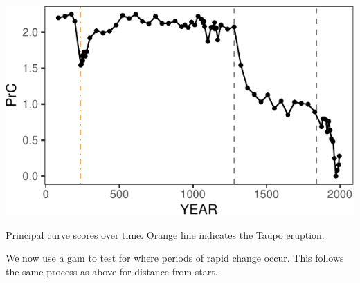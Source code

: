 \documentclass[nofonts,]{tufte-handout}
\newenvironment{Shaded}{\begin{snugshade}}{\end{snugshade}}
\newcommand{\AttributeTok}[1]{\textcolor[rgb]{0.13,0.29,0.53}{#1}}
\newcommand{\CommentTok}[1]{\textcolor[rgb]{0.56,0.35,0.01}{\textit{#1}}}
\newcommand{\DecValTok}[1]{\textcolor[rgb]{0.00,0.00,0.81}{#1}}
\newcommand{\FunctionTok}[1]{\textcolor[rgb]{0.13,0.29,0.53}{\textbf{#1}}}
\newcommand{\NormalTok}[1]{#1}
\newcommand{\OtherTok}[1]{\textcolor[rgb]{0.56,0.35,0.01}{#1}}
\newcommand{\SpecialCharTok}[1]{\textcolor[rgb]{0.81,0.36,0.00}{\textbf{#1}}}
\newcommand{\StringTok}[1]{\textcolor[rgb]{0.31,0.60,0.02}{#1}}
\begin{document}
\begin{marginfigure}
\includegraphics{Technical-supplement_files/figure-latex/prRawFitPlot-1} \caption[Principal curve scores over time]{Principal curve scores over time. Orange line indicates the Taupō eruption.}\label{fig:prRawFitPlot}
\end{marginfigure}

We now use a gam to test for where periods of rapid change occur. This
follows the same process as above for distance from start.

\begin{Shaded}
\end{Shaded}
\end{document}
